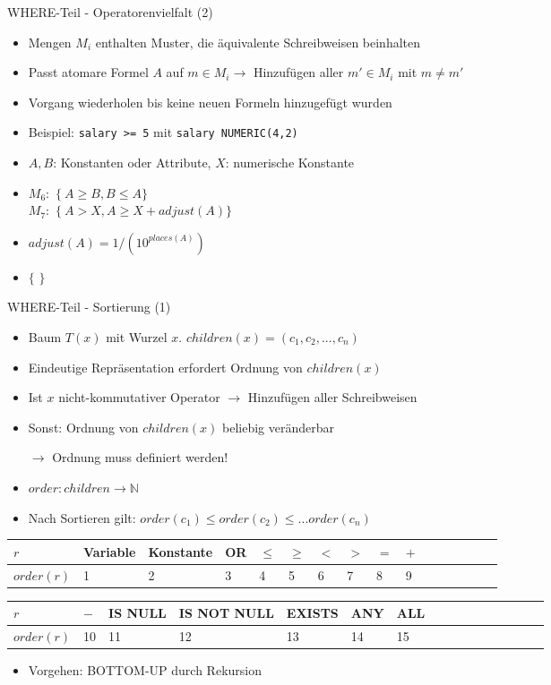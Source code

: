 \documentclass{beamer}
\begin{document}
\begin{frame}[fragile]{WHERE-Teil - Operatorenvielfalt (2)}
\begin{itemize}
\item Mengen $M_i$ enthalten Muster, die äquivalente Schreibweisen beinhalten
\item Passt atomare Formel $A$ auf $m\in M_i \to$ Hinzufügen aller $m'\in M_i$ mit $m\neq m'$
\item Vorgang wiederholen bis keine neuen Formeln hinzugefügt wurden
\item Beispiel: \verb|salary >= 5| mit \verb|salary NUMERIC(4,2)|
\item $A,B$: Konstanten oder Attribute, $X$: numerische Konstante
\item $M_6:$  $\{\ A\geq B, B\leq A \}$\\ 
$M_7:$  $\{\ A>X, A\geq X+\mathit{adjust}(A) \}$\\
\item $\mathit{adjust}(A) = 1 / (10^{\mathit{places}(A)})$
\item  $\{$       $\}$ 
\end{itemize}
\end{frame}


\begin{frame}[fragile]{WHERE-Teil - Sortierung (1)}
\begin{itemize}
\item Baum $T(x)$ mit Wurzel $x$. $children(x) = (c_1,c_2,...,c_n)$
\item Eindeutige Repräsentation erfordert Ordnung von $children(x)$
\item Ist $x$ nicht-kommutativer Operator $\to$ Hinzufügen aller Schreibweisen
\item Sonst: Ordnung von $children(x)$ beliebig veränderbar
\item[$\to$] Ordnung muss definiert werden! 
\item $order: children \to \mathbb{N}$
\item Nach Sortieren gilt: $order(c_1) \leq order(c_2) \leq ... order(c_n)$
\end{itemize}
\begin{tabular}{|l|l|l|l|l|l|l|l|l|l|l|l|l|l|l|l|}
\hline
$r$ & Variable & Konstante & OR & $\le$ & $\ge$ & $<$ & $>$ & $=$ & $+$\\\hline
$\textit{order}(r)$ & 1 & 2 & 3 & 4 & 5 & 6 & 7 & 8 & 9\\ 
\hline
\end{tabular}\newline
\begin{tabular}{|l|l|l|l|l|l|l|l|l|l|l|l|l|l|l|l|}
\hline
$r$  & $-$  & IS NULL & IS NOT NULL & EXISTS & ANY & ALL  \\\hline
$\textit{order}(r)$ &   10 & 11& 12 & 13 & 14 & 15 \\ 
\hline
\end{tabular}
\begin{itemize}
\item Vorgehen: BOTTOM-UP durch Rekursion
\end{itemize}
\end{frame}
\end{document}
